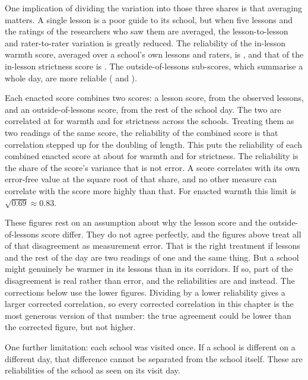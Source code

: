 

One implication of dividing the variation into those three shares is that averaging matters. A single lesson is a poor guide to its school, but when
five lessons and the ratings of the researchers who saw them are averaged,
the lesson-to-lesson and rater-to-rater variation is greatly reduced. The reliability of the
in-lesson warmth score,
averaged over a school's own lessons and raters, is \RelWLessons{}, and that of the in-lesson
strictness score is \RelSLessons{}. The outside-of-lessons sub-scores, which summarise a whole day,
are more
reliable (\RelWOutside{} and \RelSOutside{}).

Each enacted score combines two scores: a lesson score, from the observed
lessons, and an outside-of-lessons score, from the rest of the school day.
The two are correlated at \HalvesW{} for warmth and \HalvesS{} for strictness across
the \NHalves{} schools. Treating them as two readings of the same score, the reliability of the combined score is that correlation stepped up for the doubling of length. This puts the reliability of each combined enacted score at
about \RelEnactedW{} for warmth and \RelEnactedS{} for
strictness. The reliability is the share of the score's variance that is not error. A score correlates with its own error-free value at the square root of that share, and no other measure can correlate with the score more highly than that. For enacted warmth this limit is $\sqrt{0.69} \approx 0.83$.

These figures rest on an assumption about why the lesson score and the
outside-of-lessons score differ. They do not agree perfectly, and the
figures above treat all of that disagreement as
measurement error. That is the right treatment if lessons and the rest of the day are two
readings of one and the same thing. But a school might genuinely be warmer in its lessons
than in its corridors. If so, part of the disagreement is real rather than error, and the
reliabilities are \RelEnactedWUpper{} and \RelEnactedSUpper{} instead. The corrections below
use the lower figures. Dividing by a lower reliability gives a larger corrected correlation,
so every corrected correlation in this chapter is the most generous version of that number:
the true agreement could be lower than the corrected figure, but not higher.

One further limitation: each school was visited once. If a school is different on a different day,
that difference cannot be separated from the school itself. These are reliabilities of
the school as seen on its visit day.

